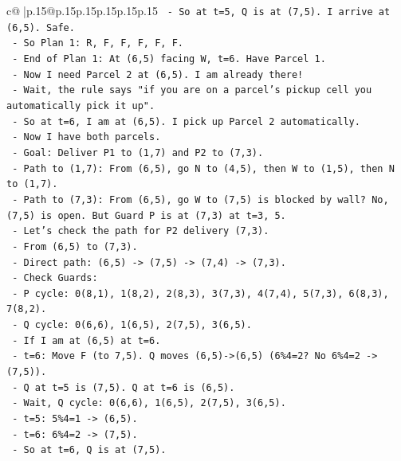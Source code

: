 \documentclass{article}
\begin{document}
{\begin{supertabular}{c@{$\;$}|p{.15\linewidth}@{}p{.15\linewidth}p{.15\linewidth}p{.15\linewidth}p{.15\linewidth}p{.15\linewidth}}
{{{\texttt{            {-} So at t=5, Q is at (7,5). I arrive at (6,5). Safe.} \\
\texttt{            {-} So Plan 1: R, F, F, F, F, F.} \\
\texttt{            {-} End of Plan 1: At (6,5) facing W, t=6. Have Parcel 1.} \\
\texttt{            {-} Now I need Parcel 2 at (6,5). I am already there!} \\
\texttt{            {-} Wait, the rule says "if you are on a parcel's pickup cell you automatically pick it up".} \\
\texttt{            {-} So at t=6, I am at (6,5). I pick up Parcel 2 automatically.} \\
\texttt{            {-} Now I have both parcels.} \\
\texttt{            {-} Goal: Deliver P1 to (1,7) and P2 to (7,3).} \\
\texttt{            {-} Path to (1,7): From (6,5), go N to (4,5), then W to (1,5), then N to (1,7).} \\
\texttt{            {-} Path to (7,3): From (6,5), go W to (7,5) is blocked by wall? No, (7,5) is open. But Guard P is at (7,3) at t=3, 5.} \\
\texttt{            {-} Let's check the path for P2 delivery (7,3).} \\
\texttt{            {-} From (6,5) to (7,3).} \\
\texttt{            {-} Direct path: (6,5) {-}> (7,5) {-}> (7,4) {-}> (7,3).} \\
\texttt{            {-} Check Guards:} \\
\texttt{                {-} P cycle: 0(8,1), 1(8,2), 2(8,3), 3(7,3), 4(7,4), 5(7,3), 6(8,3), 7(8,2).} \\
\texttt{                {-} Q cycle: 0(6,6), 1(6,5), 2(7,5), 3(6,5).} \\
\texttt{            {-} If I am at (6,5) at t=6.} \\
\texttt{            {-} t=6: Move F (to 7,5). Q moves (6,5){-}>(6,5) (6\%4=2? No 6\%4=2 {-}> (7,5)).} \\
\texttt{                {-} Q at t=5 is (7,5). Q at t=6 is (6,5).} \\
\texttt{                {-} Wait, Q cycle: 0(6,6), 1(6,5), 2(7,5), 3(6,5).} \\
\texttt{                {-} t=5: 5\%4=1 {-}> (6,5).} \\
\texttt{                {-} t=6: 6\%4=2 {-}> (7,5).} \\
\texttt{                {-} So at t=6, Q is at (7,5).} \\
}}}
\end{supertabular}}
\end{document}

